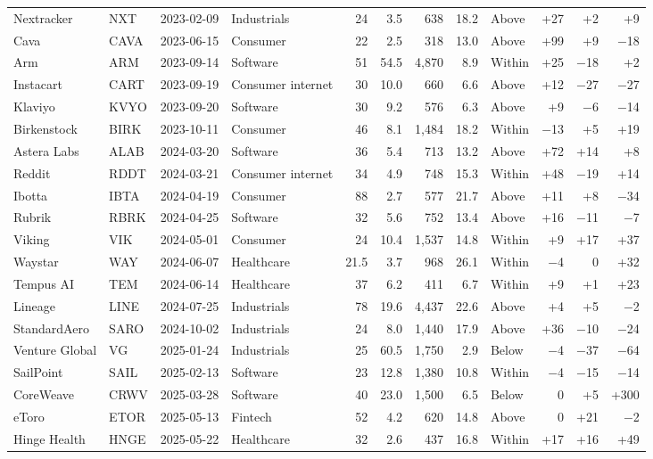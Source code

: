 \begin{scriptsize}
\begin{longtable}{llllrrrrlrrr}
Nextracker & NXT & 2023-02-09 & Industrials & 24 & 3.5 & 638 & 18.2 & Above & +27 & +2 & +9 \\
Cava & CAVA & 2023-06-15 & Consumer & 22 & 2.5 & 318 & 13.0 & Above & +99 & +9 & $-$18 \\
Arm & ARM & 2023-09-14 & Software & 51 & 54.5 & 4,870 & 8.9 & Within & +25 & $-$18 & +2 \\
Instacart & CART & 2023-09-19 & Consumer internet & 30 & 10.0 & 660 & 6.6 & Above & +12 & $-$27 & $-$27 \\
Klaviyo & KVYO & 2023-09-20 & Software & 30 & 9.2 & 576 & 6.3 & Above & +9 & $-$6 & $-$14 \\
Birkenstock & BIRK & 2023-10-11 & Consumer & 46 & 8.1 & 1,484 & 18.2 & Within & $-$13 & +5 & +19 \\
Astera Labs & ALAB & 2024-03-20 & Software & 36 & 5.4 & 713 & 13.2 & Above & +72 & +14 & +8 \\
Reddit & RDDT & 2024-03-21 & Consumer internet & 34 & 4.9 & 748 & 15.3 & Within & +48 & $-$19 & +14 \\
Ibotta & IBTA & 2024-04-19 & Consumer & 88 & 2.7 & 577 & 21.7 & Above & +11 & +8 & $-$34 \\
Rubrik & RBRK & 2024-04-25 & Software & 32 & 5.6 & 752 & 13.4 & Above & +16 & $-$11 & $-$7 \\
Viking & VIK & 2024-05-01 & Consumer & 24 & 10.4 & 1,537 & 14.8 & Within & +9 & +17 & +37 \\
Waystar & WAY & 2024-06-07 & Healthcare & 21.5 & 3.7 & 968 & 26.1 & Within & $-$4 & 0 & +32 \\
Tempus AI & TEM & 2024-06-14 & Healthcare & 37 & 6.2 & 411 & 6.7 & Within & +9 & +1 & +23 \\
Lineage & LINE & 2024-07-25 & Industrials & 78 & 19.6 & 4,437 & 22.6 & Above & +4 & +5 & $-$2 \\
StandardAero & SARO & 2024-10-02 & Industrials & 24 & 8.0 & 1,440 & 17.9 & Above & +36 & $-$10 & $-$24 \\
Venture Global & VG & 2025-01-24 & Industrials & 25 & 60.5 & 1,750 & 2.9 & Below & $-$4 & $-$37 & $-$64 \\
SailPoint & SAIL & 2025-02-13 & Software & 23 & 12.8 & 1,380 & 10.8 & Within & $-$4 & $-$15 & $-$14 \\
CoreWeave & CRWV & 2025-03-28 & Software & 40 & 23.0 & 1,500 & 6.5 & Below & 0 & +5 & +300 \\
eToro & ETOR & 2025-05-13 & Fintech & 52 & 4.2 & 620 & 14.8 & Above & 0 & +21 & $-$2 \\
Hinge Health & HNGE & 2025-05-22 & Healthcare & 32 & 2.6 & 437 & 16.8 & Within & +17 & +16 & +49 \\

\end{longtable}
\end{scriptsize}
